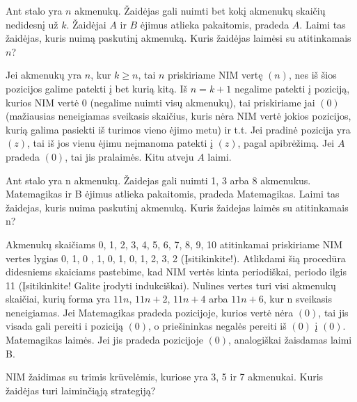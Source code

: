 \begin{pavnr}
  Ant stalo yra $n$ akmenukų. Žaidėjas gali nuimti bet kokį akmenukų
  skaičių nedidesnį už $k$. Žaidėjai $A$ ir $B$ ėjimus atlieka pakaitomis,
  pradeda $A$.  Laimi tas žaidėjas, kuris nuimą paskutinį akmenuką. Kuris
  žaidėjas laimėsi su atitinkamais $n$?
\end{pavnr}

Jei akmenukų yra $n$, kur $k \geq n$, tai $n$ priskiriame NIM vertę $(n)$, nes iš
šios pozicijos galime patekti į bet kurią kitą. Iš $n=k+1$ negalime patekti
į poziciją, kurios NIM vertė $0$ (negalime nuimti visų akmenukų), tai priskiriame jai $(0)$ (mažiausias neneigiamas sveikasis skaičius, kuris nėra NIM vertė jokios pozicijos, kurią galima pasiekti iš turimos vieno ėjimo metu) ir t.t. Jei pradinė pozicija yra $(z)$, tai iš
jos vienu ėjimu neįmanoma patekti į $(z)$, pagal apibrėžimą. Jei $A$ pradeda
$(0)$, tai jis pralaimės. Kitu atveju $A$ laimi.


\begin{pavnr}
Ant stalo yra n akmenukų. Žaidejas gali nuimti 1, 3 arba 8 akmenukus. Matemagikas ir B ėjimus atlieka pakaitomis, pradeda Matemagikas. Laimi tas žaidejas,
kuris nuima paskutinį akmenuką. Kuris žaidejas laimės su atitinkamais n?
\end{pavnr}


Akmenukų skaičiams 0, 1, 2, 3, 4, 5, 6, 7, 8, 9, 10 atitinkamai priskiriame NIM vertes lygias 0, 1, 0 , 1,
0, 1, 0, 1, 2, 3, 2 (Įsitikinkite!). Atlikdami šią procedūra didesniems skaiciams pastebime, kad
NIM vertės kinta periodiškai, periodo ilgis 11 (Įsitikinkite! Galite įrodyti indukciškai). Nulines vertes turi visi akmenukų
skaičiai, kurių forma yra $11n$, $11n+2$, $11n+4$ arba $11n+6$, kur n sveikasis neneigiamas.
Jei Matemagikas pradeda pozicijoje, kurios vertė nėra $(0)$, tai jis visada
gali pereiti i poziciją $(0)$, o priešininkas negalės pereiti iš $(0)$ į $(0)$. Matemagikas
laimės. Jei jis pradeda pozicijoje $(0)$, analogiškai žaisdamas laimi B.

\begin{pavnr} NIM žaidimas su trimis krūvelėmis, kuriose yra 3, 5 ir 7 akmenukai. Kuris žaidėjas turi laiminčiąją strategiją?
\end{pavnr}

